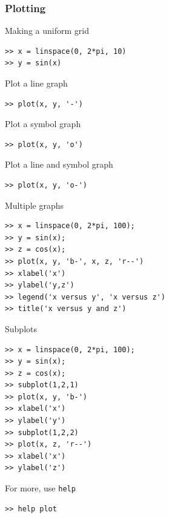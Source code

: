 \documentclass[11pt,xcolor=svgnames,onlymath]{beamer}
\begin{document}
\begin{frame}
\frametitle{Plotting}
Making a uniform grid
\begin{lstlisting}
>> x = linspace(0, 2*pi, 10)
>> y = sin(x)
\end{lstlisting}

Plot a line graph
\begin{lstlisting}
>> plot(x, y, '-')
\end{lstlisting}

Plot a symbol graph
\begin{lstlisting}
>> plot(x, y, 'o')
\end{lstlisting}

Plot a line and symbol graph
\begin{lstlisting}
>> plot(x, y, 'o-')
\end{lstlisting}

\newpage 

Multiple graphs
\begin{lstlisting}
>> x = linspace(0, 2*pi, 100);
>> y = sin(x);
>> z = cos(x);
>> plot(x, y, 'b-', x, z, 'r--')
>> xlabel('x')
>> ylabel('y,z')
>> legend('x versus y', 'x versus z')
>> title('x versus y and z')
\end{lstlisting}

\newpage

Subplots
\begin{lstlisting}
>> x = linspace(0, 2*pi, 100);
>> y = sin(x);
>> z = cos(x);
>> subplot(1,2,1)
>> plot(x, y, 'b-')
>> xlabel('x')
>> ylabel('y')
>> subplot(1,2,2)
>> plot(x, z, 'r--')
>> xlabel('x')
>> ylabel('z')
\end{lstlisting}

For more, use {\tt help}
\begin{lstlisting}
>> help plot
\end{lstlisting}

\end{frame}
\end{document}

